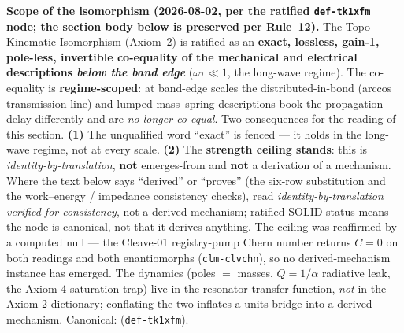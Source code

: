 \noindent\textbf{Scope of the isomorphism (2026-08-02, per the ratified \texttt{def-tk1xfm} node; the section body below is preserved per Rule~12).} The Topo-Kinematic Isomorphism (Axiom~2) is ratified as an \textbf{exact, lossless, gain-1, pole-less, invertible co-equality of the mechanical and electrical descriptions \emph{below the band edge}} ($\omega\tau \ll 1$, the long-wave regime). The co-equality is \textbf{regime-scoped}: at band-edge scales the distributed-in-bond (arccos transmission-line) and lumped mass--spring descriptions book the propagation delay differently and are \emph{no longer co-equal}. Two consequences for the reading of this section. \textbf{(1)} The unqualified word ``exact'' is fenced --- it holds in the long-wave regime, not at every scale. \textbf{(2)} The \textbf{strength ceiling stands}: this is \emph{identity-by-translation}, \textbf{not} emerges-from and \textbf{not} a derivation of a mechanism. Where the text below says ``derived'' or ``proves'' (the six-row substitution and the work--energy / impedance consistency checks), read \emph{identity-by-translation verified for consistency}, not a derived mechanism; ratified-SOLID status means the node is canonical, not that it derives anything. The ceiling was reaffirmed by a computed null --- the Cleave-01 registry-pump Chern number returns $C = 0$ on both readings and both enantiomorphs (\texttt{clm-clvchn}), so no derived-mechanism instance has emerged. The dynamics (poles $=$ masses, $Q = 1/\alpha$ radiative leak, the Axiom-4 saturation trap) live in the resonator transfer function, \emph{not} in the Axiom-2 dictionary; conflating the two inflates a units bridge into a derived mechanism. Canonical:  (\texttt{def-tk1xfm}).

